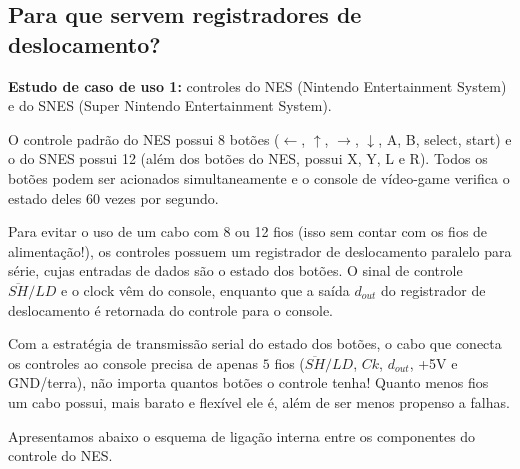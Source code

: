 \documentclass[a4paper,12pt,notitlepage]{article}
\begin{document}
\newpage

\newcommand{\stereobox}[5][]{
  \draw[thick] (#2,#3) rectangle ++(#4-0.2,#5-0.2) node[pos=.5] {#1};
  \draw[thick] (#2+#4-0.2,#3) -- (#2+#4+0.2,#3+0.4) -- (#2+#4+0.2,#3+#5+0.2)
               -- (#2+0.4,#3+#5+0.2) -- (#2,#3+#5-0.2);
  \draw[thick] (#2+#4+0.2,#3+#5+0.2) -- (#2+#4-0.2,#3+#5-0.2);
}

\newcommand{\cknode}[3]{
  \node[matrix,anchor=west] (#1) at (#2,#3) {\draw[-stealth] (0,0.2) -- (0.2,0.2) -- (0.2,-0.05); \draw[-] (0.2,0) -- (0.2,-0.2) -- (0.4,-0.2); \\ };
}


\subsection{Para que servem registradores de deslocamento?}

\textbf{Estudo de caso de uso 1:} controles do NES (Nintendo Entertainment System) e do SNES (Super Nintendo Entertainment System).

O controle padrão do NES possui 8 botões ($\leftarrow$, $\uparrow$,
$\rightarrow$, $\downarrow$, A, B, select, start) e o do SNES possui 12
(além dos botões do NES, possui X, Y, L e R). Todos os botões podem ser
acionados simultaneamente e o console de vídeo-game verifica o estado
deles 60 vezes por segundo.

Para evitar o uso de um cabo com 8 ou 12 fios (isso sem contar com os fios
de alimentação!), os controles possuem um registrador de deslocamento paralelo
para série, cujas entradas de dados são o estado dos botões. O sinal
de controle $\overline{SH}/LD$ e o clock vêm do console, enquanto que a saída
$d_{out}$ do registrador de deslocamento é retornada do controle para o
console.

Com a estratégia de transmissão serial do estado dos botões, o cabo que conecta
os controles ao console precisa de apenas $5$ fios ($\overline{SH}/LD$, $Ck$,
$d_{out}$, +5V e GND/terra), não importa quantos botões o controle tenha!
Quanto menos fios um cabo possui, mais barato e flexível ele é, além de ser
menos propenso a falhas.

Apresentamos abaixo o esquema de ligação interna entre os componentes do
controle do NES.
\end{document}
